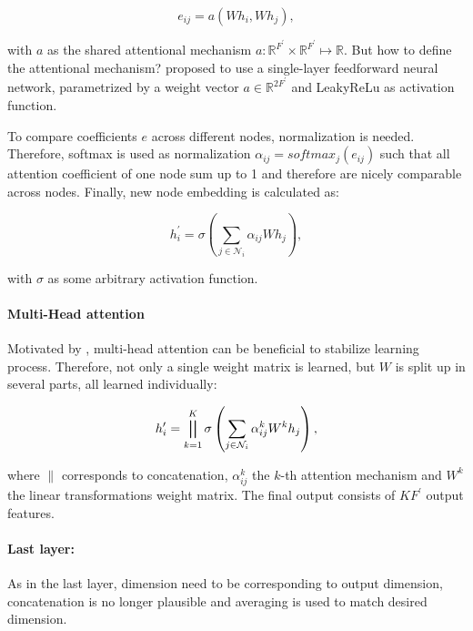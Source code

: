 \begin{equation}
  e_{ij} = a(Wh_i, Wh_j),
\end{equation}

with $a$ as the shared attentional mechanism $a : \mathbb{R}^{F^{\prime}} \times \mathbb{R}^{F^{\prime}} \mapsto \mathbb{R}$.
But how to define the attentional mechanism? 
\citet{GAT} proposed to use a single-layer feedforward neural network, parametrized by a weight vector $a \in \mathbb{R}^{2F^{\prime}}$
and LeakyReLu as activation function.

To compare coefficients $e$ across different nodes, normalization is needed.
Therefore, softmax is used as normalization $\alpha_{ij} = softmax_j(e_{ij})$ 
such that all attention coefficient of one node sum up to 1 and therefore are nicely comparable across nodes.
Finally, new node embedding is calculated as:

\begin{equation}
  h_i^{\prime} = \sigma \left( \sum_{j \in \mathcal{N}_i} \alpha_{ij} W h_j \right),
\end{equation}

with $\sigma$ as some arbitrary activation function.

\paragraph{Multi-Head attention}
Motivated by \citet{transformer}, multi-head attention can be beneficial to stabilize learning process.
Therefore, not only a single weight matrix is learned, but $W$ is split up in several parts, 
all learned individually:

\begin{equation}
  h_i^{\prime} = \bigparallel^K_{k=1} \sigma \left(\sum_{j \in \mathcal{N}_i} \alpha_{ij}^k W^k h_j \right),  
\end{equation}

where $\parallel$ corresponds to concatenation, $\alpha_{ij}^k$ the $k$-th attention mechanism and $W^k$ the linear
transformations weight matrix. The final output consists of $KF^{\prime}$ output features.

\paragraph{Last layer:}
As in the last layer, dimension need to be corresponding to output dimension, 
concatenation is no longer plausible and averaging is used to match desired dimension.

